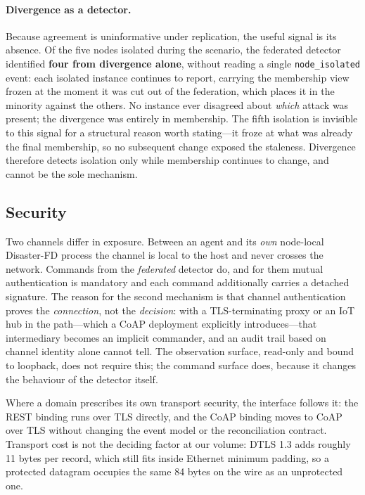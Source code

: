 \paragraph{Divergence as a detector.} Because agreement is uninformative under replication,
the useful signal is its absence. Of the five nodes isolated during the scenario, the
federated detector identified \textbf{four from divergence alone}, without reading a single
\texttt{node\_isolated} event: each isolated instance continues to report, carrying the
membership view frozen at the moment it was cut out of the federation, which places it in
the minority against the others. No instance ever disagreed about \emph{which} attack was
present; the divergence was entirely in membership. The fifth isolation is invisible to this
signal for a structural reason worth stating---it froze at what was already the final
membership, so no subsequent change exposed the staleness. Divergence therefore detects
isolation only while membership continues to change, and cannot be the sole mechanism.

\subsection{Security}
\label{sec:api-security}

Two channels differ in exposure. Between an agent and its \emph{own} node-local Disaster-FD
process the channel is local to the host and never crosses the network. Commands from the
\emph{federated} detector do, and for them mutual authentication is mandatory and each
command additionally carries a detached signature. The reason for the second mechanism is
that channel authentication proves the \emph{connection}, not the \emph{decision}: with a
TLS-terminating proxy or an IoT hub in the path---which a CoAP deployment explicitly
introduces---that intermediary becomes an implicit commander, and an audit trail based on
channel identity alone cannot tell. The observation surface, read-only and bound to
loopback, does not require this; the command surface does, because it changes the behaviour
of the detector itself.

Where a domain prescribes its own transport security, the interface follows it: the REST
binding runs over TLS directly, and the CoAP binding moves to CoAP over TLS without changing
the event model or the reconciliation contract. Transport cost is not the deciding factor
at our volume: DTLS 1.3 adds roughly 11 bytes per record, which still fits inside Ethernet
minimum padding, so a protected datagram occupies the same 84 bytes on the wire as an
unprotected one.

